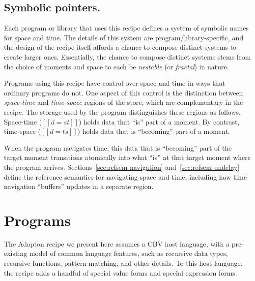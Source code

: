 \documentclass[11pt]{article}
\begin{document}
\subsection{Symbolic pointers.}
\label{sec:symbolic-pointers}

Each program or library that uses this recipe
defines a system of symbolic names for space and time.
The details of this system are program/library-specific, and the
design of the recipe itself affords a chance to compose distinct systems to
create larger ones.
Essentially, the chance to compose distinct systems stems from the choice of moments
and space to each be \emph{nestable} (or \emph{fractal}) in nature.

\nolinenumbers
\ottgrammartabular{
  {\makeLineNumber\stepLineNumber} \ottSpace
  \\
   {\makeLineNumber\stepLineNumber} \ottMoment
  \\
   {\makeLineNumber\stepLineNumber} \ottp
  \\
   {\makeLineNumber\stepLineNumber} \ottpp
  \\
  {\makeLineNumber\stepLineNumber} \ottd
}
\linenumbers

Programs using this recipe have control over space and time in ways
that ordinary programs do not.
%
One aspect of this control is the distinction between
\emph{space-time} and \emph{time-space} regions of the store, which are complementary in
the recipe.
%
The storage used by the program distinguishes these regions as follows.
%
Space-time ($[[d = st]]$) holds data that ``is'' part of a moment.
By contrast,
time-space ($[[d = ts]]$) holds data that is ``becoming'' part of a moment.

When the program navigates time, this data that is ``becoming'' part
of the target moment transitions atomically into what ``is'' at that
target moment where the program arrives.
%
Sections~\ref{sec:refsem-navigation} and~\ref{sec:refsem-undelay}
define the reference semantics for navigating space and time, including
how time navigation ``buffers'' updates in a separate region.


\section{Programs}
\label{sec:programs}

The Adapton recipe we present here assumes a CBV host language, with a
pre-existing model of common language features, such as recursive data
types, recursive functions, pattern matching, and other details.
%
To this host language, the recipe adds a handful of special value
forms and special expression forms.
\end{document}

